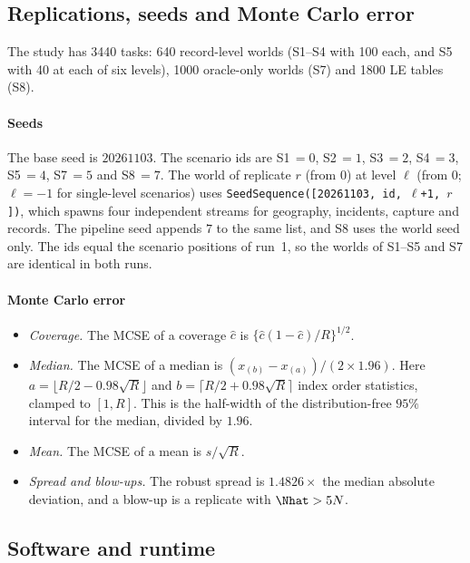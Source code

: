 \subsection{Replications, seeds and Monte Carlo error}\label{app:sim-seeds}

The study has 3440 tasks: 640 record-level worlds (S1--S4 with 100 each, and S5 with 40 at each of six levels), 1000 oracle-only worlds (S7) and 1800 LE tables (S8).

\paragraph{Seeds} The base seed is $20261103$. The scenario ids are S1\,$=0$, S2\,$=1$, S3\,$=2$, S4\,$=3$, S5\,$=4$, S7\,$=5$ and S8\,$=7$. The world of replicate $r$ (from 0) at level $\ell$ (from 0; $\ell=-1$ for single-level scenarios) uses \texttt{SeedSequence([20261103, id, $\ell$+1, $r$])}, which spawns four independent streams for geography, incidents, capture and records. The pipeline seed appends $7$ to the same list, and S8 uses the world seed only. The ids equal the scenario positions of run~1, so the worlds of S1--S5 and S7 are identical in both runs.

\paragraph{Monte Carlo error}
\begin{itemize}
  \item \emph{Coverage.} The MCSE of a coverage $\hat c$ is $\{\hat c(1-\hat c)/R\}^{1/2}$.
  \item \emph{Median.} The MCSE of a median is $(x_{(b)}-x_{(a)})/(2\times1.96)$. Here $a=\lfloor R/2-0.98\sqrt R\rfloor$ and $b=\lceil R/2+0.98\sqrt R\rceil$ index order statistics, clamped to $[1,R]$. This is the half-width of the distribution-free $95\%$ interval for the median, divided by $1.96$.
  \item \emph{Mean.} The MCSE of a mean is $s/\sqrt R$.
  \item \emph{Spread and blow-ups.} The robust spread is $1.4826\times$ the median absolute deviation, and a blow-up is a replicate with $\Nhat>5N$.
\end{itemize}

\subsection{Software and runtime}\label{app:sim-software}

